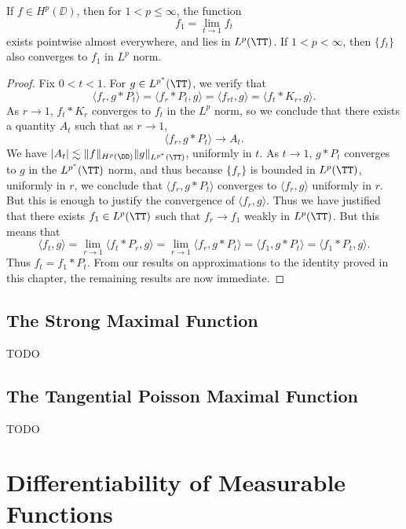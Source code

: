 \begin{theorem}
    If $f \in H^p(\DD)$, then for $1 < p \leq \infty$, the function
    \[ f_1 = \lim_{t \to 1} f_t \]
    exists pointwise almost everywhere, and lies in $L^p(\TT)$. If $1 < p < \infty$, then $\{ f_t \}$ also converges to $f_1$ in $L^p$ norm.
\end{theorem}
\begin{proof}
    Fix $0 < t < 1$. For $g \in L^{p^*}(\TT)$, we verify that
    \[ \langle f_r, g * P_t \rangle = \langle f_r * P_t, g \rangle = \langle f_{rt}, g \rangle = \langle f_t * K_r, g \rangle. \]
    As $r \to 1$, $f_t * K_r$ converges to $f_t$ in the $L^p$ norm, so we conclude that there exists a quantity $A_t$ such that as $r \to 1$,
    \[ \langle f_r, g * P_t \rangle \to A_t. \]
    We have $|A_t| \lesssim \| f \|_{H^p(\DD)} \| g \|_{L^{p^*}(\TT)}$, uniformly in $t$. As $t \to 1$, $g * P_t$ converges to $g$ in the $L^{p^*}(\TT)$ norm, and thus because $\{ f_r \}$ is bounded in $L^p(\TT)$, uniformly in $r$, we conclude that $\langle f_r, g * P_t \rangle$ converges to $\langle f_r, g \rangle$ uniformly in $r$. But this is enough to justify the convergence of $\langle f_r, g \rangle$. Thus we have justified that there exists $f_1 \in L^p(\TT)$ such that $f_r \to f_1$ weakly in $L^p(\TT)$. But this means that
    \[ \langle f_t, g \rangle = \lim_{r \to 1} \langle f_t * P_r, g \rangle = \lim_{r \to 1} \langle f_r, g * P_t \rangle = \langle f_1, g * P_t \rangle = \langle f_1 * P_t, g \rangle. \]
    Thus $f_t = f_1 * P_t$. From our results on approximations to the identity proved in this chapter, the remaining results are now immediate.
\end{proof}

\section{The Strong Maximal Function}

TODO

\section{The Tangential Poisson Maximal Function}

TODO

\chapter{Differentiability of Measurable Functions}

